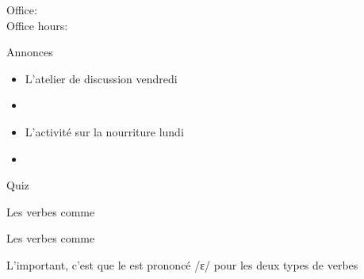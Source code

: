 \documentclass{beamer}
\subtitle[Verbes (\lexi{acheter} et \lexi{appeler})]{Les verbes comme \lexi{acheter} et \lexi{appeler}}
\begin{document}
  \begin{frame}
    \titlepage
    \tiny{Office: \\
          Office hours: }
  \end{frame}

  \begin{frame}{Annonces}
    \begin{itemize}
      \item L'atelier de discussion vendredi
      \item[] 
      \item L'activité sur la nourriture lundi
      \item[] 
    \end{itemize}
  \end{frame}

  \begin{frame}{}
    \begin{center}
      \Large Quiz
    \end{center}
  \end{frame}

  \begin{frame}{Les verbes comme }
    \begin{center}
      
    \end{center}
  \end{frame}

  \begin{frame}{Les verbes comme }
    \begin{center}
      
    \end{center}
    L'important, c'est que le  est prononcé /ɛ/ pour les deux types de verbes\\
  \end{frame}
\end{document}
